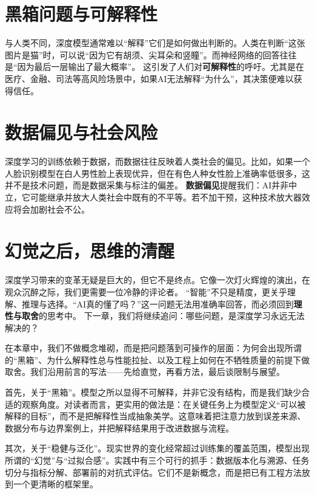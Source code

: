 \section*{黑箱问题与可解释性}
与人类不同，深度模型通常难以“解释”它们是如何做出判断的。人类在判断“这张图片是猫”时，可以说“因为它有胡须、尖耳朵和竖瞳”。而神经网络的回答往往是“因为最后一层输出了最大概率”。
这引发了人们对\textbf{可解释性}的呼吁。尤其是在医疗、金融、司法等高风险场景中，如果AI无法解释“为什么”，其决策便难以获得信任。
\section*{数据偏见与社会风险}
深度学习的训练依赖于数据，而数据往往反映着人类社会的偏见。比如，如果一个人脸识别模型在白人男性脸上表现优异，但在有色人种女性脸上准确率低很多，这并不是技术问题，而是数据采集与标注的偏差。
\textbf{数据偏见}提醒我们：AI并非中立，它可能继承并放大人类社会中既有的不平等。若不加干预，这种技术放大器效应将会加剧社会不公。
\section*{幻觉之后，思维的清醒}
深度学习带来的变革无疑是巨大的，但它不是终点。它像一次灯火辉煌的演出，在观众沉醉之际，我们更需要一位冷静的评论者。
“智能”不只是精度，更关乎理解、推理与选择。“AI真的懂了吗？”这一问题无法用准确率回答，而必须回到\textbf{理性与取舍}的思考中。
下一章，我们将继续追问：哪些问题，是深度学习永远无法解决的？
\nocite{*}
\printbibliography[heading=bibintoc, title=\ebibname]
\newpage


在本章中，我们不做概念堆砌，而是把问题落到可操作的层面：为何会出现所谓的“黑箱”、为什么解释性总与性能拉扯、以及工程上如何在不牺牲质量的前提下做取舍。我们沿用前言的写法——先给直觉，再看方法，最后谈限制与展望。

首先，关于“黑箱”。模型之所以显得不可解释，并非它没有结构，而是我们缺少合适的观察角度。对读者而言，更实用的做法是：在关键任务上为模型定义“可以被解释的目标”，而不是把解释性当成抽象美学。这意味着把注意力放到误差来源、数据分布与边界案例上，并把解释结果用于改进数据与流程。

其次，关于“稳健与泛化”。现实世界的变化经常超过训练集的覆盖范围，模型出现所谓的“幻觉”与“过拟合感”。实践中有三个可行的抓手：数据版本化与溯源、任务切分与指标分解、部署前的对抗式评估。它们不是新概念，而是把已有工程方法放到一个更清晰的框架里。

